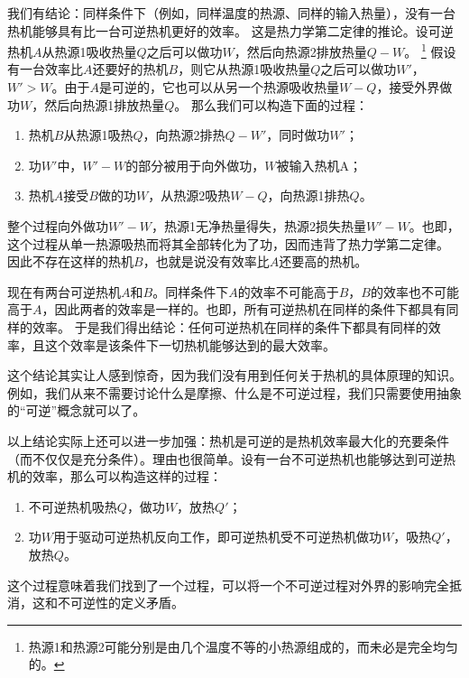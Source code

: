 \documentclass[hyperref, UTF8, a4paper]{ctexart}
\begin{document}
我们有结论：同样条件下（例如，同样温度的热源、同样的输入热量），没有一台热机能够具有比一台可逆热机更好的效率。
这是热力学第二定律的推论。设可逆热机$A$从热源1吸收热量$Q$之后可以做功$W$，然后向热源2排放热量$Q-W$。%
\footnote{热源1和热源2可能分别是由几个温度不等的小热源组成的，而未必是完全均匀的。}%
假设有一台效率比$A$还要好的热机$B$，则它从热源1吸收热量$Q$之后可以做功$W'$，$W'>W$。由于$A$是可逆的，它也可以从另一个热源吸收热量$W-Q$，接受外界做功$W$，然后向热源1排放热量$Q$。
那么我们可以构造下面的过程：
\begin{enumerate}
    \item 热机$B$从热源1吸热$Q$，向热源2排热$Q-W'$，同时做功$W'$；
    \item 功$W'$中，$W'-W$的部分被用于向外做功，$W$被输入热机A；
    \item 热机$A$接受$B$做的功$W$，从热源2吸热$W-Q$，向热源1排热$Q$。
\end{enumerate}
整个过程向外做功$W'-W$，热源1无净热量得失，热源2损失热量$W'-W$。也即，这个过程从单一热源吸热而将其全部转化为了功，因而违背了热力学第二定律。
因此不存在这样的热机$B$，也就是说没有效率比$A$还要高的热机。

现在有两台可逆热机$A$和$B$。同样条件下$A$的效率不可能高于$B$，$B$的效率也不可能高于$A$，因此两者的效率是一样的。也即，所有可逆热机在同样的条件下都具有同样的效率。
于是我们得出结论：任何可逆热机在同样的条件下都具有同样的效率，且这个效率是该条件下一切热机能够达到的最大效率。

这个结论其实让人感到惊奇，因为我们没有用到任何关于热机的具体原理的知识。例如，我们从来不需要讨论什么是摩擦、什么是不可逆过程，我们只需要使用抽象的“可逆”概念就可以了。

以上结论实际上还可以进一步加强：热机是可逆的是热机效率最大化的充要条件（而不仅仅是充分条件）。理由也很简单。设有一台不可逆热机也能够达到可逆热机的效率，那么可以构造这样的过程：
\begin{enumerate}
    \item 不可逆热机吸热$Q$，做功$W$，放热$Q'$；
    \item 功$W$用于驱动可逆热机反向工作，即可逆热机受不可逆热机做功$W$，吸热$Q'$，放热$Q$。
\end{enumerate}
这个过程意味着我们找到了一个过程，可以将一个不可逆过程对外界的影响完全抵消，这和不可逆性的定义矛盾。
\end{document}
